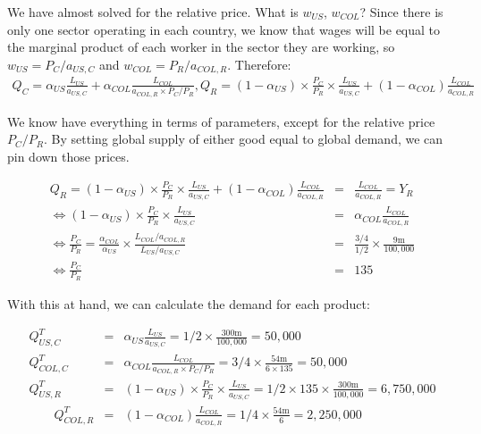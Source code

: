 \documentclass[11pt,letterpaper]{article}
\begin{document}
\newpage


We have almost solved for the relative price. What is $w_{US}$, $w_{COL}$? Since there is only one sector operating in each country, we know that wages will be equal to the marginal product of each worker in the sector they are working, so $w_{US} = P_{C} / a_{US,C}$ and $w_{COL} = P_{R} / a_{COL,R}$. Therefore:
\begin{eqnarray*}
    Q_{C} = \alpha_{US} \frac{L_{US} }{a_{US,C}} + \alpha_{COL} \frac{L_{COL} }{a_{COL,R} \times  P_C/P_R}, Q_{R} = (1-\alpha_{US}) \times \frac{P_C}{P_R} \times \frac{ L_{US} }{a_{US,C}} + (1-\alpha_{COL}) \frac{L_{COL} }{a_{COL,R}}    
\end{eqnarray*}

We know have everything in terms of parameters, except for the relative price $P_C/P_R$. By setting global supply of either good equal to global demand, we can pin down those prices.  

\begin{eqnarray*}
    Q_{R} = (1-\alpha_{US}) \times \frac{P_C}{P_R} \times \frac{ L_{US} }{a_{US,C}} + (1-\alpha_{COL}) \frac{L_{COL} }{a_{COL,R}} &=& \frac{L_{COL} }{a_{COL,R}} = Y_R \\ 
\iff (1-\alpha_{US}) \times \frac{P_C}{P_R} \times \frac{ L_{US} }{a_{US,C}} &=& \alpha_{COL} \frac{L_{COL} }{a_{COL,R}} \\
\iff \frac{P_C}{P_R}  = \frac{\alpha_{COL}}{\alpha_{US}} \times \frac{L_{COL}/a_{COL,R}}{L_{US} / a_{US,C}} &=& \frac{3/4}{1/2} \times \frac{9 \text{m}}{100{,}000} \\ 
\iff \frac{P_C}{P_R} &=& 135
\end{eqnarray*}

With this at hand, we can calculate the demand for each product:

\begin{eqnarray*}
    Q^T_{US,C} &=& \alpha_{US} \frac{L_{US} }{a_{US,C}} = 1/2 \times \frac{300 \text{m}}{100{,}000} = 50,000 \\
    Q^T_{COL,C} &=& \alpha_{COL} \frac{L_{COL} }{a_{COL,R} \times P_C/P_R} = 3/4 \times \frac{54 \text{m}}{6 \times 135} = 50,000 \\
    Q^T_{US,R} &=& (1- \alpha_{US}) \times \frac{P_C}{P_R} \times \frac{L_{US} }{a_{US,C}} = 1/2 \times 135 \times \frac{300 \text{m}}{100{,}000} = 6,750,000 \\
    \qquad Q^T_{COL,R} &=& (1-\alpha_{COL}) \frac{L_{COL} }{a_{COL,R} } = 1/4 \times \frac{54 \text{m}}{6} = 2,250,000
\end{eqnarray*}
\end{document}
